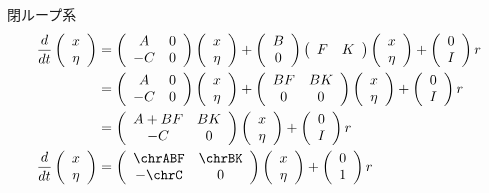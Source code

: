 閉ループ系
\begin{align*}
	\frac{d}{dt}
	\left (
	\begin{array}{c}
	 x \\ \eta 
	\end{array}
	\right )
	& = 
	\left (
	\begin{array}{cc}
	 A & 0 \\
	 -C& 0
	\end{array}
	\right )
	\state
	+
	\left (
	\begin{array}{c}
	 B \\ 0 
	\end{array}
	\right )
	\left ( \begin{array}{cc}
			F & K \end{array} \right )
	\state
	+
	\left (
	\begin{array}{c}
	 0 \\ I 
	\end{array}
	\right )
	r
\\
	& = 
	\left (
	\begin{array}{cc}
	 A & 0 \\
	 -C& 0
	\end{array}
	\right )
	\state
	+
	\left (
	\begin{array}{cc}
	 B F & BK \\ 0 &0
	\end{array}
	\right )
	\state
	+
	\left (
	\begin{array}{c}
	 0 \\ I 
	\end{array}
	\right )
	r
\\
	& = 
	\left (
	\begin{array}{cc}
	 A+BF & BK \\
	 -C& 0
	\end{array}
	\right )
	\state
	+
	\left (
	\begin{array}{c}
	 0 \\ I 
	\end{array}
	\right )
	r
\\
	\frac{d}{dt}
	\state
	& = 
	\left (
	\begin{array}{cc}
	 \chrABF & \chrBK \\
	 -\chrC & 0
	\end{array}
	\right )
	\state
	+
	\left (
	\begin{array}{c}
	 0 \\ 1 
	\end{array}
	\right )
	r
\end{align*}

